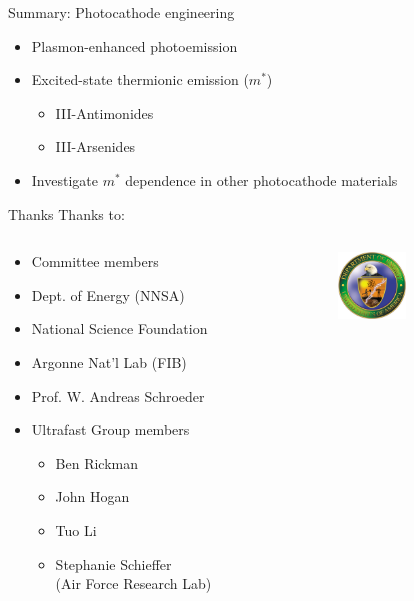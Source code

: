 \documentclass[mathserif]{beamer}
\begin{document}
\begin{frame}{Summary: Photocathode engineering}
\begin{itemize}
  \item Plasmon-enhanced photoemission
  \item Excited-state thermionic emission ($m^*$)
  \begin{itemize}
    \item III-Antimonides
    \item III-Arsenides
  \end{itemize}
  \item Investigate $m^*$ dependence in other photocathode materials
\end{itemize}
\end{frame}

\begin{frame}{Thanks}
Thanks to:
\begin{columns}
  \begin{column}{.49\linewidth}
    \begin{itemize}
      \item Committee members
      \item Dept. of Energy (NNSA)
      \item National Science Foundation
      \item Argonne Nat'l Lab (FIB)
      \item Prof. W. Andreas Schroeder
      \item Ultrafast Group members
      \begin{itemize}
        \item Ben Rickman
        \item John Hogan
        \item Tuo Li
        \item Stephanie Schieffer\\(Air Force Research Lab)
      \end{itemize}
    \end{itemize}
  \end{column}

  \begin{column}{.49\linewidth}
    \begin{columns}
      \begin{column}{1in}
        \begin{figure}
          \includegraphics[width=0.7in]{doe}
        \end{figure}
      \end{column}


\end{columns}
\end{column}
\end{columns}
\end{frame}
\end{document}
